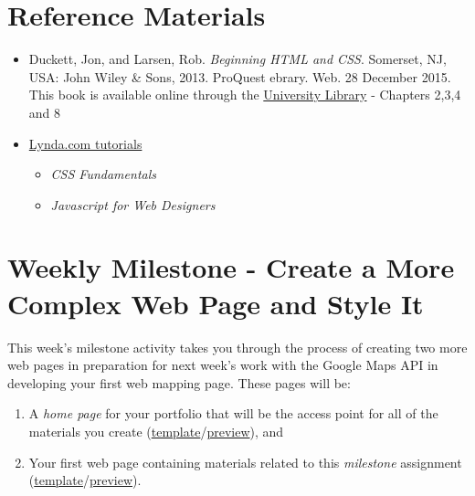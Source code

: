 \documentclass[]{book}
\providecommand{\tightlist}{%
  \setlength{\itemsep}{0pt}\setlength{\parskip}{0pt}}
\begin{document}
\section{Reference Materials}\label{week02-reference}

\begin{itemize}
\item
  Duckett, Jon, and Larsen, Rob. \emph{Beginning HTML and CSS}.
  Somerset, NJ, USA: John Wiley \& Sons, 2013. ProQuest ebrary. Web. 28
  December 2015. This book is available online through the
  \href{http://site.ebrary.com.libproxy.unm.edu/lib/unma/detail.action?docID=10667426}{University
  Library} - Chapters 2,3,4 and 8
\item
  \href{http://www.lynda.com/SharedPlaylist/2b710369c9ec4d8c964467225c6610ad?org=unm.edu}{Lynda.com
  tutorials}

  \begin{itemize}
  \tightlist
  \item
    \emph{CSS Fundamentals}
  \item
    \emph{Javascript for Web Designers}
  \end{itemize}
\end{itemize}

\section{Weekly Milestone - Create a More Complex Web Page and Style
It}\label{week02-milestone}

This week's milestone activity takes you through the process of creating
two more web pages in preparation for next week's work with the Google
Maps API in developing your first web mapping page. These pages will be:

\begin{enumerate}
\def\labelenumi{\arabic{enumi}.}
\item
  A \emph{home page} for your portfolio that will be the access point
  for all of the materials you create
  (\href{https://raw.githubusercontent.com/UNM-GEOG-485-585/class-materials/master/sample-files/homePageTemplate.html}{template}/\href{http://htmlpreview.github.io/?https://github.com/UNM-GEOG-485-585/class-materials/blob/master/sample-files/homePageTemplate.html}{preview}),
  and
\item
  Your first web page containing materials related to this
  \emph{milestone} assignment
  (\href{https://github.com/UNM-GEOG-485-585/class-materials/blob/master/sample-files/assignmentTemplate.html}{template}/\href{http://htmlpreview.github.io/?https://github.com/UNM-GEOG-485-585/class-materials/blob/master/sample-files/assignmentTemplate.html}{preview}).
\end{enumerate}
\end{document}
